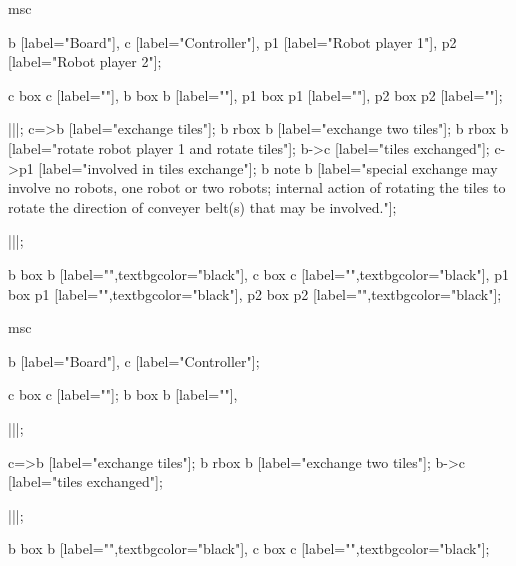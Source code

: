 \begin{msc}
msc
{

b [label="Board"],
c [label="Controller"],
p1 [label="Robot player 1"],
p2 [label="Robot player 2"];

c box c [label=""],
b box b [label=""],
p1 box p1 [label=""],
p2 box p2 [label=""];

|||;
c=>b [label="exchange tiles"];
b rbox b [label="exchange two tiles"];
b rbox b [label="rotate robot player 1 and rotate tiles"];
b->c [label="tiles exchanged"];
c->p1 [label="involved in tiles exchange"];
b note b [label="special exchange may involve no robots, one robot or two robots; internal action of rotating the tiles to rotate the direction of conveyer belt(s) that may be involved."];

|||;

b box b [label="",textbgcolor="black"],
c box c [label="",textbgcolor="black"],
p1 box p1 [label="",textbgcolor="black"],
p2 box p2 [label="",textbgcolor="black"];

}
\end{msc}
\begin{msc}
msc
{

b [label="Board"],
c [label="Controller"];

c box c [label=""];
b box b [label=""],

|||;

c=>b [label="exchange tiles"];
b rbox b [label="exchange two tiles"];
b->c [label="tiles exchanged"];

|||;

b box b [label="",textbgcolor="black"],
c box c [label="",textbgcolor="black"];

}
\end{msc}
